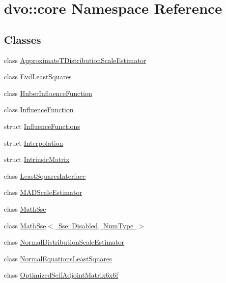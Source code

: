 \hypertarget{namespacedvo_1_1core}{}\section{dvo\+:\+:core Namespace Reference}
\label{namespacedvo_1_1core}
\subsection*{Classes}
\begin{DoxyCompactItemize}
\item 
class \mbox{\hyperlink{classdvo_1_1core_1_1_approximate_t_distribution_scale_estimator}{Approximate\+T\+Distribution\+Scale\+Estimator}}
\item 
class \mbox{\hyperlink{classdvo_1_1core_1_1_evd_least_squares}{Evd\+Least\+Squares}}
\item 
class \mbox{\hyperlink{classdvo_1_1core_1_1_huber_influence_function}{Huber\+Influence\+Function}}
\item 
class \mbox{\hyperlink{classdvo_1_1core_1_1_influence_function}{Influence\+Function}}
\item 
struct \mbox{\hyperlink{structdvo_1_1core_1_1_influence_functions}{Influence\+Functions}}
\item 
struct \mbox{\hyperlink{structdvo_1_1core_1_1_interpolation}{Interpolation}}
\item 
struct \mbox{\hyperlink{structdvo_1_1core_1_1_intrinsic_matrix}{Intrinsic\+Matrix}}
\item 
class \mbox{\hyperlink{classdvo_1_1core_1_1_least_squares_interface}{Least\+Squares\+Interface}}
\item 
class \mbox{\hyperlink{classdvo_1_1core_1_1_m_a_d_scale_estimator}{M\+A\+D\+Scale\+Estimator}}
\item 
class \mbox{\hyperlink{classdvo_1_1core_1_1_math_sse}{Math\+Sse}}
\item 
class \mbox{\hyperlink{classdvo_1_1core_1_1_math_sse_3_01_sse_1_1_disabled_00_01_num_type_01_4}{Math\+Sse$<$ Sse\+::\+Disabled, Num\+Type $>$}}
\item 
class \mbox{\hyperlink{classdvo_1_1core_1_1_normal_distribution_scale_estimator}{Normal\+Distribution\+Scale\+Estimator}}
\item 
class \mbox{\hyperlink{classdvo_1_1core_1_1_normal_equations_least_squares}{Normal\+Equations\+Least\+Squares}}
\item 
class \mbox{\hyperlink{classdvo_1_1core_1_1_optimized_self_adjoint_matrix6x6f}{Optimized\+Self\+Adjoint\+Matrix6x6f}}

\end{DoxyCompactItemize}
